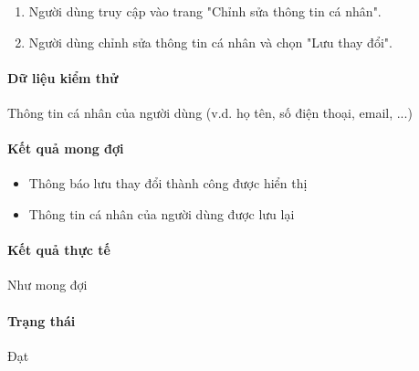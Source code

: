 \documentclass[./../main.tex]{subfiles}
\begin{document}
\begin{enumerate}
    \item Người dùng truy cập vào trang "Chỉnh sửa thông tin cá nhân".
    \item Người dùng chỉnh sửa thông tin cá nhân và chọn "Lưu thay đổi".
\end{enumerate}

\paragraph*{Dữ liệu kiểm thử} Thông tin cá nhân của người dùng (v.d. họ tên, số điện thoại, email, ...)

\paragraph*{Kết quả mong đợi}

\begin{itemize}
    \item Thông báo lưu thay đổi thành công được hiển thị
    \item Thông tin cá nhân của người dùng được lưu lại
\end{itemize}

\paragraph*{Kết quả thực tế} Như mong đợi

\paragraph*{Trạng thái} Đạt
\end{document}

